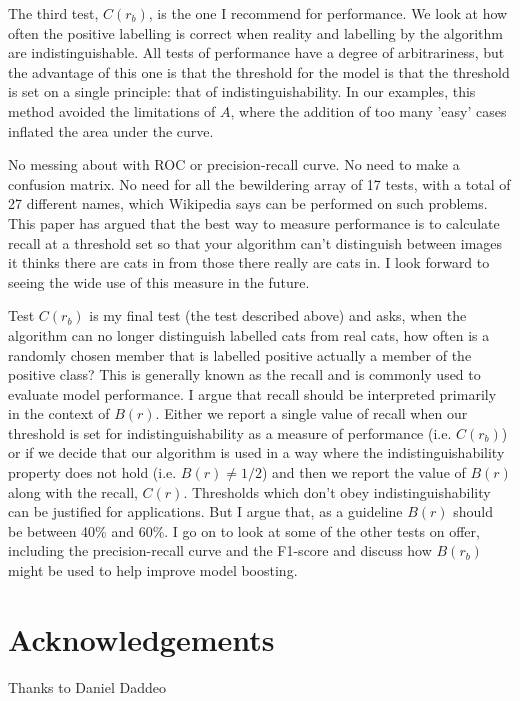 \documentclass{article}
\begin{document}
The third test, $C(r_b)$, is the one I recommend for performance. We look at how often the positive labelling is correct when reality and labelling by the algorithm are indistinguishable. All tests of performance have a degree of arbitrariness, but the advantage of this one is that the threshold for the model is that the threshold is set on a single principle: that of indistinguishability. In our examples, this method avoided the limitations of $A$, where the addition of too many 'easy' cases inflated the area under the curve. 

No messing about with ROC or precision-recall curve. No need to make a confusion matrix. No need for all the bewildering array of 17 tests, with a total of 27 different names, which Wikipedia says can be performed on such problems. This paper has argued that the best way to measure performance is to calculate recall at a threshold set so that your algorithm can't distinguish between images it thinks there are cats in from those there really are cats in.  I look forward to seeing the wide use of this measure in the future. 

Test $C(r_b)$ is my final test (the test described above) and asks, when the algorithm can no longer distinguish labelled cats from real cats, how often is a randomly chosen member that is labelled positive actually a member of the positive class? This is generally known as the recall and is commonly used to evaluate model performance. I argue that recall should be interpreted primarily in the context of $B(r)$. Either we report a single value of recall when our threshold is set for indistinguishability as a measure of performance (i.e. $C(r_b)$) or if we decide that our algorithm is used in a way where the indistinguishability property does not hold (i.e. $B(r) \neq 1/2$) and then we report the value of $B(r)$ along with the recall, $C(r)$. Thresholds which don't obey indistinguishability can be justified for applications. But I argue that, as a guideline $B(r)$ should be between 40\% and 60\%.  I go on to look at some of the other tests on offer, including the precision-recall curve and the F1-score and discuss how $B(r_b)$ might be used to help improve model boosting. 

\section{Acknowledgements}

Thanks to Daniel Daddeo
\end{document}
